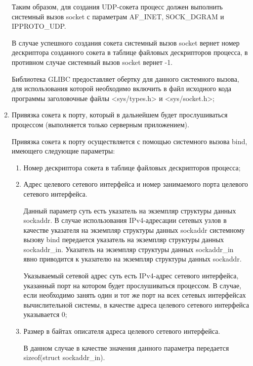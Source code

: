 \begin{enumerate}
			Таким образом, для создания UDP-сокета процесс должен выполнить системный вызов socket с параметрам AF\_INET, SOCK\_DGRAM и IPPROTO\_UDP.

			В случае успешного создания сокета системный вызов socket вернет номер дескриптора созданного сокета в таблице файловых
			дескрипторов процесса, в противном случае системный вызов socket вернет -1.

			Библиотека GLIBC предоставляет обертку для данного системного вызова, для использования которой необходимо включить в файл исходного кода программы
			заголовочные файлы <sys/types.h> и <sys/socket.h>;

		\item Привязка сокета к порту, который в дальнейшем будет прослушиваться процессом (выполняется только серверным приложением).

			Привязка сокета к порту осуществляется с помощью системного вызова bind, имеющего следующие параметры:

				\begin{enumerate}

					\item Номер дескриптора сокета в таблице файловых дескрипторов процесса;
					\item Адрес целевого сетевого интерфейса и номер занимаемого порта целевого сетевого интерфейса.

						Данный параметр суть есть указатель на экземпляр структуры данных sockaddr.
						В случае использования IPv4-адресации сетевых узлов в качестве указателя на экземпляр
						структуры данных sockaddr системному вызову bind передается указатель на экземпляр структуры данных sockaddr\_in.
						Указатель на экземпляр структуры данных sockaddr\_in явно приводится к указателю на экземпляр структуры данных sockaddr.

						Указываемый сетевой адрес суть есть IPv4-адрес сетевого интерфейса, указанный порт на котором будет прослушиваться процессом.
						В случае, если необходимо занять один и тот же порт на всех
						сетевых интерфейсах вычислительной системы, в качестве адреса целевого сетевого интерфейса указывается 0;

					\item Размер в байтах описателя адреса целевого сетевого интерфейса.

					В данном случае в качестве значения данного параметра передается\\sizeof(struct sockaddr\_in).

				\end{enumerate}


\end{enumerate}
